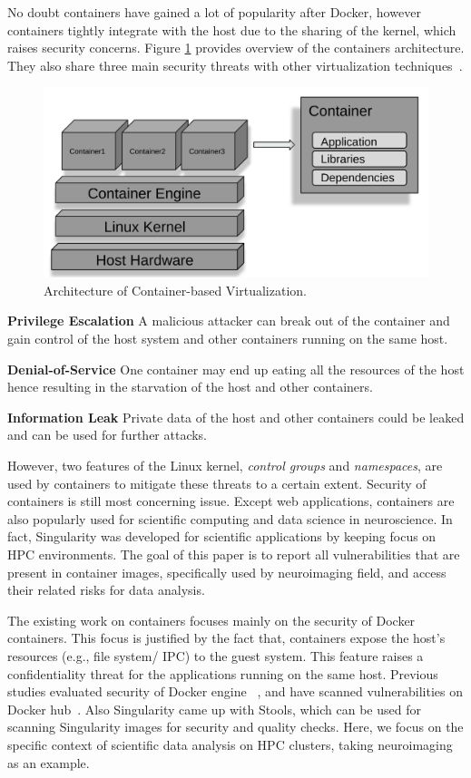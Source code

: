 \documentclass[a4paper,num-refs]{oup-contemporary}
\begin{document}
No doubt containers have gained a lot of popularity after Docker, however containers tightly
integrate with the host due to the sharing of the kernel, which raises security
concerns. Figure \ref{fig:container-overview} provides overview of the containers architecture.
They also share three main security threats with other virtualization
techniques~\cite{gantikow2016providing}.

\begin{figure}
  \centering
  \includegraphics[width=.7\columnwidth]{Figures/container.png}
  \caption{Architecture of Container-based
                Virtualization.}
  \label{fig:container-overview}
\end{figure}

\textbf{Privilege Escalation} A malicious attacker can break out of the container
and gain control of the host system and other containers running on the same host.

\textbf{Denial-of-Service} One container may end up eating all the resources of the
host hence resulting in the starvation of the host and other containers.

\textbf{Information Leak} Private data of the host and other containers could be
leaked and can be used for further attacks.

However, two features of the Linux kernel, \textit{control groups} and \textit{namespaces},
are used by containers to mitigate these threats to a certain extent. Security
of containers is still most concerning issue.
Except web applications, containers are also popularly used for scientific computing
and data science in neuroscience. In fact, Singularity was developed for scientific applications
by keeping focus on HPC environments.
The goal of this paper is to report all vulnerabilities that are present in
container images, specifically used by neuroimaging field, and access their
related risks for data analysis.

The existing work on containers focuses mainly on the security of Docker
containers.
This focus is justified by the fact that, containers expose the host's resources
(e.g., file system/ IPC) to the guest system. This feature raises a confidentiality
threat for the applications running on the same host. Previous studies evaluated
security of Docker engine ~\cite{martin2018docker, sultan2019container, combe2016docker, bui2015analysis},
and have scanned vulnerabilities on Docker hub~\cite{Shu2017, gummaraju2015over}.
Also Singularity came up with Stools, which can be used for scanning Singularity images
for security and quality checks.
Here, we focus on the specific context of scientific data analysis on HPC clusters, taking
neuroimaging as an example.
\end{document}
